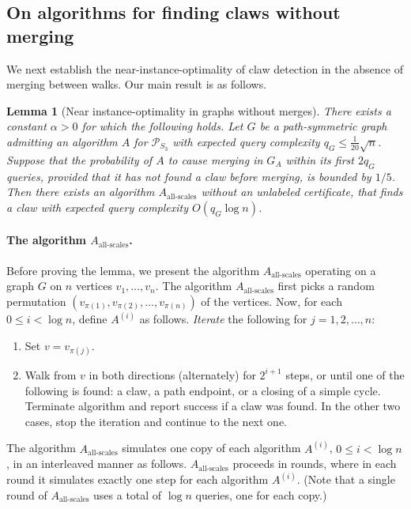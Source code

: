 \documentclass[11pt]{article}
\numberwithin{equation}{section}
\newtheorem{lemma}[lemma]{Lemma}
\renewcommand{\P}{\mathcal{P}}
\newcommand{\1}{\mathbf{1}}
\begin{document}
\subsection{On algorithms for finding claws without merging}\label{sec:final}
We next establish the near-instance-optimality of claw detection in the absence of merging between walks. Our main result is as follows. 

\begin{lemma}[Near instance-optimality in graphs without merges]
\label{lem:instance_optimality_graphs_no_merges}
There exists a constant $\alpha > 0$ for which the following holds.
Let $G$ be a path-symmetric graph admitting an algorithm $A$ for $\P_{S_3}$ with expected query complexity $q_G \leq \frac{1}{20}\sqrt{n}$. Suppose that the probability of $A$ to cause merging in $G_A$ within its first $2q_G$ queries, provided that it has not found a claw before merging, is bounded by $1/5$. 
Then there exists an algorithm $A_{\text{all-scales}}$ without an unlabeled certificate, that finds a claw with expected query complexity $O(q_G \log n)$.
\end{lemma}

\paragraph{The algorithm $A_{\text{all-scales}}$.}
Before proving the lemma, we present the  algorithm $A_{\text{all-scales}}$ operating on a graph $G$ on $n$ vertices $v_1, \ldots, v_n$. The algorithm $A_{\text{all-scales}}$ first picks a random permutation $(v_{\pi(1)}, v_{\pi(2)}, \ldots, v_{\pi(n)})$ of the vertices. Now, for each $0 \leq i < \log n$, define $A^{(i)}$ as follows. 
\textit{Iterate} the following for $j=1,2,\ldots,n$: 
\begin{enumerate}
\item Set $v = v_{\pi(j)}$.
\item Walk from $v$ in both directions (alternately) for $2^{i+1}$ steps, or until one of the following is found: a claw, a path endpoint, or a closing of a simple cycle. Terminate algorithm and report success if a claw was found. In the other two cases, stop the iteration and continue to the next one.
\end{enumerate}

The algorithm $A_{\text{all-scales}}$ simulates one copy of each algorithm $A^{(i)}$, $0 \leq i < \log n$, in an interleaved manner as follows. $A_{\text{all-scales}}$ proceeds in rounds, where in each round it simulates exactly one step for each algorithm $A^{(i)}$. (Note that a single round of $A_{\text{all-scales}}$ uses a total of $\log n$ queries, one for each copy.)
\end{document}
